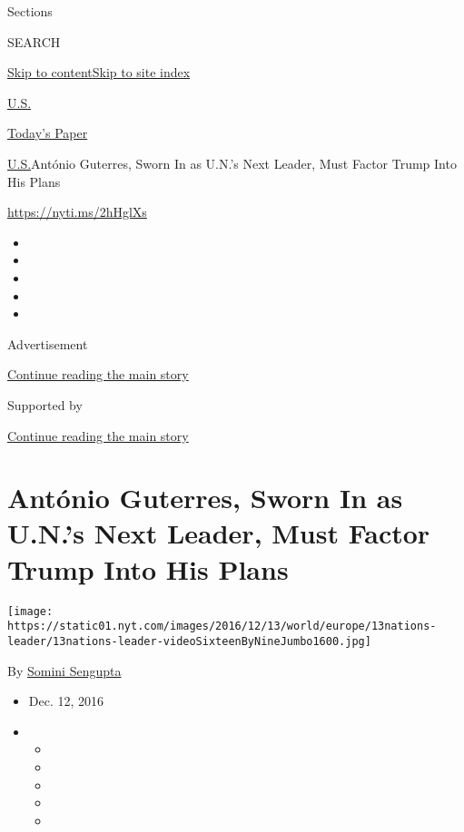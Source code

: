 Sections

SEARCH

\protect\hyperlink{site-content}{Skip to
content}\protect\hyperlink{site-index}{Skip to site index}

\href{https://www.nytimes.com/section/us}{U.S.}

\href{https://myaccount.nytimes.com/auth/login?response_type=cookie\&client_id=vi}{}

\href{https://www.nytimes.com/section/todayspaper}{Today's Paper}

\href{/section/us}{U.S.}\textbar{}António Guterres, Sworn In as U.N.'s
Next Leader, Must Factor Trump Into His Plans

\url{https://nyti.ms/2hHglXs}

\begin{itemize}
\item
\item
\item
\item
\item
\end{itemize}

Advertisement

\protect\hyperlink{after-top}{Continue reading the main story}

Supported by

\protect\hyperlink{after-sponsor}{Continue reading the main story}

\hypertarget{antuxf3nio-guterres-sworn-in-as-uns-next-leader-must-factor-trump-into-his-plans}{%
\section{António Guterres, Sworn In as U.N.'s Next Leader, Must Factor
Trump Into His
Plans}\label{antuxf3nio-guterres-sworn-in-as-uns-next-leader-must-factor-trump-into-his-plans}}

\texttt{[image: https://static01.nyt.com/images/2016/12/13/world/europe/13nations-leader/13nations-leader-videoSixteenByNineJumbo1600.jpg]}

By \href{http://www.nytimes.com/by/somini-sengupta}{Somini Sengupta}

\begin{itemize}
\item
  Dec. 12, 2016
\item
  \begin{itemize}
  \item
  \item
  \item
  \item
  \item
  \end{itemize}
\end{itemize}

